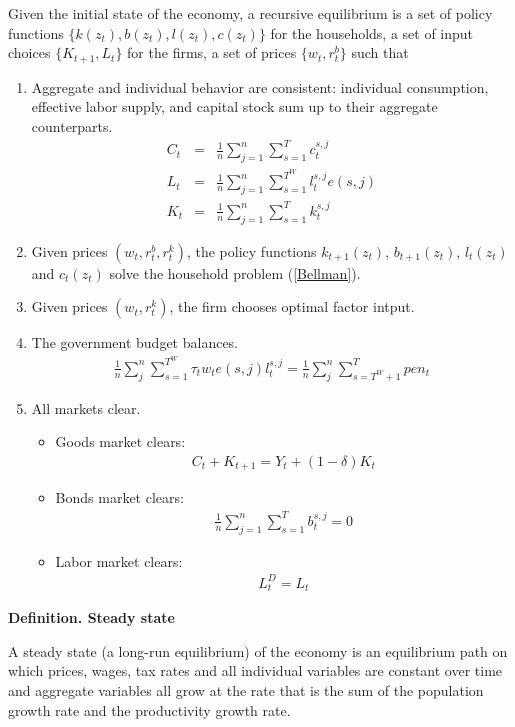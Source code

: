 \documentclass[12pt]{article}
\begin{document}
Given the initial state of the economy, a recursive equilibrium is a set of policy functions $\{k(z_t), b(z_t), l(z_t), c(z_t)\}$  for the households, a set of input choices $\{K_{t+1}, L_t\}$ for the firms, a set of prices $\{w_t,r_t^b\}$ such that 
\begin{enumerate}
	\item Aggregate and individual behavior are consistent: individual consumption, effective labor supply, and capital stock sum up to their aggregate counterparts. 
		\begin{eqnarray}
			C_t&=& \frac{1}{n}\sum_{j=1}^{n}\sum_{s=1}^{T}c_t^{s,j}\\
			L_t&=&\frac{1}{n} \sum_{j=1}^{n}\sum_{s=1}^{T^W}l_t^{s,j}e(s,j)\\
			K_t&=&\frac{1}{n} \sum_{j=1}^{n}\sum_{s=1}^{T}k_t^{s,j}
		\end{eqnarray}
	\item Given prices $(w_t,r_t^b,r_t^k)$, the policy functions $k_{t+1}(z_t)$, $b_{t+1}(z_t)$, $l_{t}(z_t)$ and $c_{t}(z_t)$ solve the household problem (\ref{Bellman}). 
	\item Given prices $(w_t,r_t^k)$, the firm chooses optimal factor intput.   
	\item The government budget balances.  
	\begin{eqnarray} \frac{1}{n}\sum_{j}^{n}\sum_{s=1}^{T^W}\tau_tw_te(s,j)l_{t}^{s,j} = \frac{1}{n} \sum_{j}^{n}\sum_{s=T^W+1}^{T}pen_t
	\end{eqnarray}
	\item All markets clear.
	\begin{itemize}
		\item Goods market clears:
			\begin{eqnarray}
			C_t+K_{t+1}=Y_t+(1-\delta)K_t
			\end{eqnarray}
		\item Bonds market clears:
			\begin{eqnarray}
			\frac{1}{n}\sum_{j=1}^{n}\sum_{s=1}^{T}b_t^{s,j} =0
			\end{eqnarray}
		\item Labor market clears:
			\begin{eqnarray}
			L_t^D=L_t
			\end{eqnarray}
	\end{itemize}
\end{enumerate}

\textbf{Definition. Steady state} 

A steady state (a long-run equilibrium) of the economy is an equilibrium path on which prices, wages, tax rates and all individual variables are constant over time and aggregate variables all grow at the rate that is the sum of the population growth rate and the productivity growth rate. 
\end{document}
